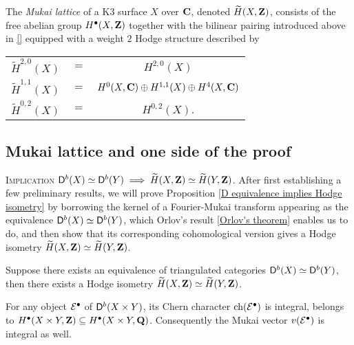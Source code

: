 \begin{definition}
    The \emph{Mukai lattice} of a K3 surface $X$ over $\mathbf C$, denoted $\widetilde{H}(X, \mathbf Z)$, consists of the free abelian group $H^{\bullet}(X, \mathbf Z)$ together with the bilinear pairing introduced above in \eqref{} equipped with a weight $2$ Hodge structure described by 
\end{definition}

\begin{center}
    \begin{tabular}{r c c}
        $\widetilde{H}^{2,0}(X)$ & $=$ & $H^{2,0}(X)$ \\
        $\widetilde{H}^{1,1}(X)$ & $=$ & $H^{0}(X, \mathbf C) \oplus H^{1,1}(X) \oplus H^{4}(X, \mathbf C)$ \\
        $\widetilde{H}^{0,2}(X)$ & $=$ & $H^{0,2}(X)$.
    \end{tabular}
\end{center}

\subsection{Mukai lattice and one side of the proof}


\noindent
\textsc{Implication $\mathsf{D}^b(X) \simeq \mathsf{D}^b(Y) \implies \widetilde{H}(X, \mathbf Z) \simeq \widetilde{H}(Y, \mathbf Z)$.} After first establishing a few preliminary results, we will prove Proposition \ref{D equivalence implies Hodge isometry} by borrowing the kernel of a Fourier-Mukai transform appearing as the equivalence $\mathsf{D}^b(X) \simeq \mathsf{D}^b(Y)$, which Orlov's result \ref{Orlov's theorem} enables us to do, and then show that its corresponding cohomological version gives a Hodge isometry $\widetilde{H}(X, \mathbf Z) \simeq \widetilde{H}(Y, \mathbf Z)$.

\begin{proposition}
    \label{D equivalence implies Hodge isometry}
    Suppose there exists an equivalence of triangulated categories $\mathsf{D}^b(X) \simeq \mathsf{D}^b(Y)$, then there exists a Hodge isometry $\widetilde{H}(X, \mathbf Z) \simeq \widetilde{H}(Y, \mathbf Z)$.
\end{proposition}

\begin{lemma}
    \label{Mukai vector is integral}
    For any object $\mathcal E^\bullet$ of $\mathsf{D}^b(X \times Y)$, its Chern character $\ch{\E^\bullet}$ is integral, \ie belongs to $H^\bullet(X \times Y, \mathbf Z) \subseteq H^\bullet(X \times Y, \mathbf Q)$. Consequently the Mukai vector $v(\mathcal E^\bullet)$ is integral as well.
\end{lemma}

